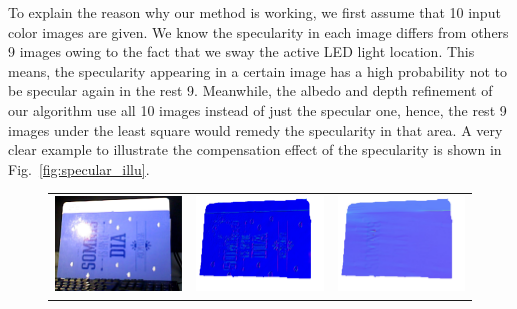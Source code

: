 To explain the reason why our method is working, we first assume that 10 input color images are given.
We know the specularity in each image differs from others 9 images owing to the fact that we sway the active LED light location.
This means, the specularity appearing in a certain image has a high probability not to be specular again in the rest 9.
Meanwhile, the albedo and depth refinement of our algorithm use all 10 images instead of just the specular one,
hence, the rest 9 images under the least square would remedy the specularity in that area.
A very clear example to illustrate the compensation effect of the specularity is shown in Fig.~\ref{fig:specular_illu}.
\begin{figure}[!ht]
\centering
\setlength{\tabcolsep}{0.1em} %
 {\renewcommand{\arraystretch}{1.6}%
\begin{tabular}{c|c c}
   \includegraphics[height = 0.24\linewidth]{figures/result/robust_folder_rgb.pdf} 
   &
   \includegraphics[height = 0.24\linewidth]{figures/result/rgbd_folder_normal.pdf} &
   \includegraphics[height = 0.24\linewidth]{figures/result/robust_folder_normal.pdf} \\


\end{tabular}}
\end{figure}
